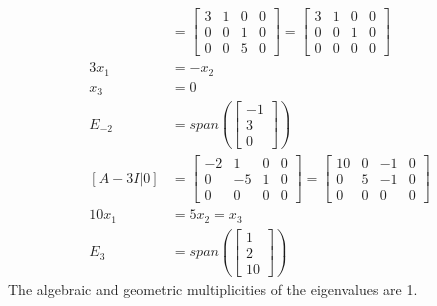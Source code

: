 \documentclass{math}
\begin{document}
\begin{align*}
  [A+2I|0] &= \begin{bmatrix}
    3 & 1 & 0 & 0 \\
    0 & 0 & 1 & 0 \\
    0 & 0 & 5 & 0
  \end{bmatrix} = \begin{bmatrix}
    3 & 1 & 0 & 0 \\
    0 & 0 & 1 & 0 \\
    0 & 0 & 0 & 0
  \end{bmatrix} \\
  3x_1 &= -x_2 \\
  x_3 &= 0 \\
  E_{-2} &= span\left(\begin{bmatrix}-1 \\ 3 \\ 0\end{bmatrix}\right) \\
  [A-3I|0] &= \begin{bmatrix}
    -2 & 1 & 0 & 0 \\
    0 & -5 & 1 & 0 \\
    0 & 0 & 0 & 0
  \end{bmatrix} = \begin{bmatrix}
    10 & 0 & -1 & 0 \\
    0 & 5 & -1 & 0 \\
    0 & 0 & 0 & 0
  \end{bmatrix} \\
  10x_1 &= 5x_2 = x_3 \\
  E_3 &= span\left(\begin{bmatrix}1 \\ 2 \\ 10\end{bmatrix}\right)
\end{align*}
The algebraic and geometric multiplicities of the eigenvalues are 1.
\end{document}
